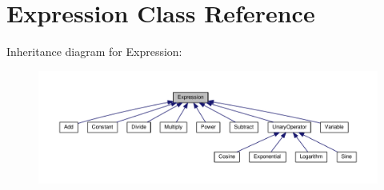 \hypertarget{classExpression}{}\section{Expression Class Reference}
\label{classExpression}


Inheritance diagram for Expression\+:\nopagebreak
\begin{figure}[H]
\begin{center}
\leavevmode
\includegraphics[width=350pt]{classExpression__inherit__graph}
\end{center}
\end{figure}

